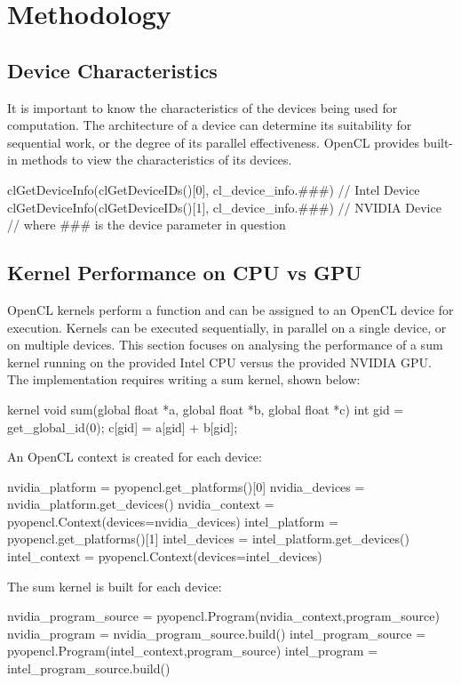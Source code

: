 \section{Methodology}

\subsection{Device Characteristics}
It is important to know the characteristics of the devices being used for computation. The architecture of a device can determine its suitability for sequential work, or the degree of its parallel effectiveness. OpenCL provides built-in methods to view the characteristics of its devices.

\begin{Cpp}
clGetDeviceInfo(clGetDeviceIDs()[0], cl_device_info.###) // Intel Device
clGetDeviceInfo(clGetDeviceIDs()[1], cl_device_info.###) // NVIDIA Device
// where ### is the device parameter in question

\end{Cpp}


\subsection{Kernel Performance on CPU vs GPU}
OpenCL kernels perform a function and can be assigned to an OpenCL device for execution. Kernels can be executed sequentially, in parallel on a single device, or on multiple devices. This section focuses on analysing the performance of a sum kernel running on the provided Intel CPU versus the provided NVIDIA GPU. The implementation requires writing a sum kernel, shown below:
\begin{Cpp}
kernel void sum(global float *a, global float *b, global float *c){
  int gid = get_global_id(0);
  c[gid] = a[gid] + b[gid];}
\end{Cpp}

An OpenCL context is created for each device:
\begin{Cpp}
nvidia_platform = pyopencl.get_platforms()[0]
nvidia_devices = nvidia_platform.get_devices()
nvidia_context = pyopencl.Context(devices=nvidia_devices)
intel_platform = pyopencl.get_platforms()[1]
intel_devices = intel_platform.get_devices()
intel_context = pyopencl.Context(devices=intel_devices)
\end{Cpp}


The sum kernel is built for each device:
\begin{Cpp}
nvidia_program_source = pyopencl.Program(nvidia_context,program_source)
nvidia_program = nvidia_program_source.build()
intel_program_source = pyopencl.Program(intel_context,program_source)
intel_program = intel_program_source.build()
\end{Cpp}


